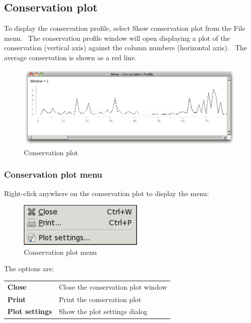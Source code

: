 \documentclass[letterpaper]{article}
\begin{document}
\subsection[Conservation plot ]{Conservation plot }
To display the conservation profile, select {\textquotesingle}Show conservation plot{\textquotesingle} from the File menu. \ The conservation profile window will open displaying a plot of the conservation (vertical axis) against the column numbers (horizontal axis). \ The average conservation is shown as a red line.

\begin{figure}[htb]
\centering
\color{lightblue}
\includegraphics[width=\textwidth]{img_window_conservation_plot.png}
\caption{Conservation plot}
\label{fig:cons_plot}
\end{figure}


\subsubsection[Conservation plot menu]{Conservation plot menu}
Right-click anywhere on the conservation plot to display the menu:


\begin{figure}[htb]
\centering
\color{lightblue}
\includegraphics[width=6cm]{img_menu_conservation_plot.png}
\caption{Conservation plot menu}
\label{fig:cons_plot_menu}
\end{figure}

The options are:

\begin{supertabular}{>{\bfseries}l l}
Close &
Close the conservation plot window\\
Print &
Print the conservation plot\\
Plot settings &
Show the plot settings dialog\\
\end{supertabular}
\end{document}
